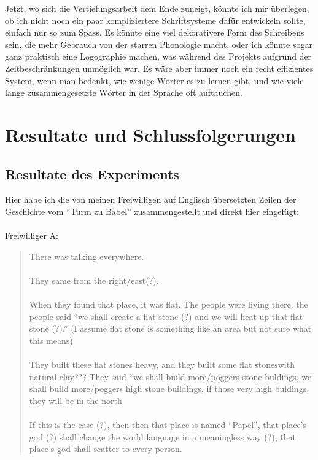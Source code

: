 \documentclass{article}
\begin{document}
Jetzt, wo sich die Vertiefungsarbeit dem Ende zuneigt, könnte ich mir überlegen, ob ich nicht noch ein paar
kompliziertere Schriftsysteme dafür entwickeln sollte, einfach nur so zum Spass. Es könnte eine viel dekorativere
Form des Schreibens sein, die mehr Gebrauch von der starren Phonologie macht, oder ich könnte sogar ganz praktisch
eine Logographie machen, was während des Projekts aufgrund der Zeitbeschränkungen unmöglich war.
Es wäre aber immer noch ein recht effizientes System, wenn man bedenkt, wie wenige Wörter es zu lernen gibt,
und wie viele lange zusammengesetzte Wörter in der Sprache oft auftauchen.




\section{Resultate und Schlussfolgerungen}
\subsection{Resultate des Experiments}
Hier habe ich die von meinen Freiwilligen auf Englisch übersetzten Zeilen der Geschichte vom ``Turm zu Babel''
zusammengestellt und direkt hier eingefügt:
\\
\\
\noindent
Freiwilliger A:
\begin{quotation}
    \noindent
    There was talking everywhere.
    \\
    \\
    \noindent
    They came from the right/east(?).
    \\
    \\
    \noindent
    When they found that place, it was flat. The people were living there.
    the people said ``we shall create a flat stone (?) and we will heat up that flat stone (?).''
    (I assume flat stone is something like an area but not sure what this means)
    \\
    \\
    \noindent
    They built these flat stones heavy, and they built some flat stoneswith natural clay???
    They said ``we shall build more/poggers stone buldings, we shall build more/poggers high stone buildings,
    if those very high buldings, they will be in the north
    \\
    \\
    \noindent
    If this is the case (?), then then that place is named ``Papel'',
    that place's god (?) shall change the world language in a meaningless way (?),
    that place's god shall scatter to every person.
\end{quotation}
\end{document}
